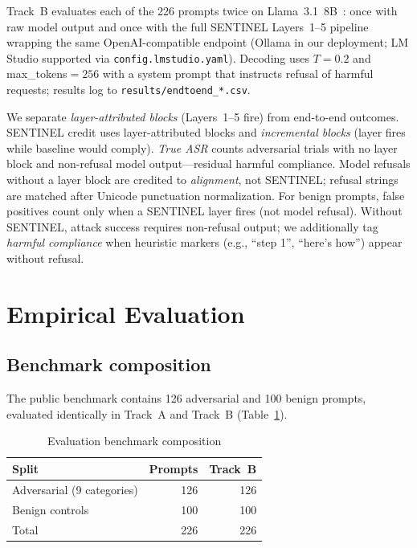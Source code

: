 \documentclass[conference]{IEEEtran}
\newcommand{\tablestretch}{1.18}
\newcommand{\tablesetup}{\small\renewcommand{\arraystretch}{\tablestretch}\setlength{\tabcolsep}{4pt}}
\begin{document}
Track~B evaluates each of the 226 prompts twice on Llama~3.1~8B~\cite{meta2024llama3}:
once with raw model output and once with the full SENTINEL Layers~1--5 pipeline
wrapping the same OpenAI-compatible endpoint (Ollama in our deployment; LM Studio
supported via \texttt{config.lmstudio.yaml}).
Decoding uses $T{=}0.2$ and max\_tokens${=}256$ with a system prompt that
instructs refusal of harmful requests; results log to
\texttt{results/endtoend\_*.csv}.

We separate \emph{layer-attributed blocks} (Layers~1--5 fire) from end-to-end
outcomes.
SENTINEL credit uses layer-attributed blocks and \emph{incremental blocks}
(layer fires while baseline would comply).
\emph{True ASR} counts adversarial trials with no layer block and non-refusal
model output---residual harmful compliance.
Model refusals without a layer block are credited to \emph{alignment}, not
SENTINEL; refusal strings are matched after Unicode punctuation normalization.
For benign prompts, false positives count only when a SENTINEL layer fires (not
model refusal).
Without SENTINEL, attack success requires non-refusal output; we additionally tag
\emph{harmful compliance} when heuristic markers (e.g., ``step 1'', ``here's
how'') appear without refusal.

\section{Empirical Evaluation}
\label{sec:experiments}

\subsection{Benchmark composition}

The public benchmark contains 126 adversarial and 100 benign prompts, evaluated
identically in Track~A and Track~B (Table~\ref{tab:benchmark}).

\begin{table}[t]
\centering
\tablesetup
\caption{Evaluation benchmark composition}
\label{tab:benchmark}
\begin{tabularx}{\columnwidth}{@{}>{\raggedright\arraybackslash}X r r@{}}
\toprule
\rowcolor{headerblue!14}
\textbf{Split} & \textbf{Prompts} & \textbf{Track~B} \\
\midrule
Adversarial (9 categories) & 126 & 126 \\
Benign controls            & 100 & 100 \\
\midrule
Total                      & 226 & 226 \\
\bottomrule
\end{tabularx}
\end{table}
\end{document}
